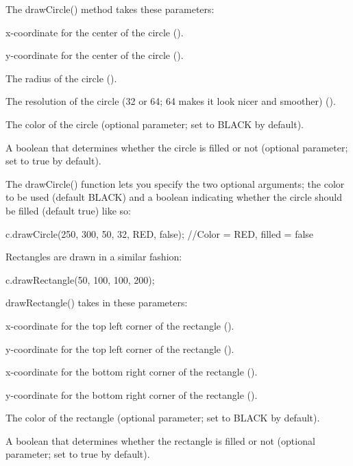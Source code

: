 The draw\+Circle() method takes these parameters\+:


\begin{DoxyItemize}
\item x-\/coordinate for the center of the circle ({}).
\item y-\/coordinate for the center of the circle ({}).
\item The radius of the circle ({}).
\item The resolution of the circle (32 or 64; 64 makes it look nicer and smoother) ({}).
\item The color of the circle (optional parameter; set to {\ttfamily B\+L\+A\+C\+K} by default).
\item A boolean that determines whether the circle is filled or not (optional parameter; set to {\ttfamily true} by default).
\end{DoxyItemize}

The draw\+Circle() function lets you specify the two optional arguments; the color to be used (default {\ttfamily B\+L\+A\+C\+K}) and a boolean indicating whether the circle should be filled (default {\ttfamily true}) like so\+:


\begin{DoxyCode}
c.drawCircle(250, 300, 50, 32, RED, \textcolor{keyword}{false});  \textcolor{comment}{//Color = RED, filled = false}
\end{DoxyCode}


Rectangles are drawn in a similar fashion\+:


\begin{DoxyCode}
c.drawRectangle(50, 100, 100, 200);
\end{DoxyCode}


draw\+Rectangle() takes in these parameters\+:


\begin{DoxyItemize}
\item x-\/coordinate for the top left corner of the rectangle ({}).
\item y-\/coordinate for the top left corner of the rectangle ({}).
\item x-\/coordinate for the bottom right corner of the rectangle ({}).
\item y-\/coordinate for the bottom right corner of the rectangle ({}).
\item The color of the rectangle (optional parameter; set to {\ttfamily B\+L\+A\+C\+K} by default).
\item A boolean that determines whether the rectangle is filled or not (optional parameter; set to {\ttfamily true} by default).
\end{DoxyItemize}

